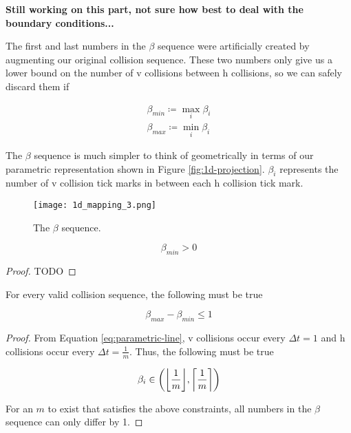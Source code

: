 \textbf{Still working on this part, not sure how best to deal with the boundary conditions...}

The first and last numbers in the $\beta$ sequence were artificially created by augmenting our original collision sequence. These two numbers only give us a lower bound on the number of v collisions between h collisions, so we can safely discard them if 

\begin{definition}
	\begin{align*}
		\beta_{min} \coloneqq \max_i \beta_i\\
		\beta_{max} \coloneqq \min_i \beta_i
	\end{align*}
\end{definition}

The $\beta$ sequence is much simpler to think of geometrically in terms of our parametric representation shown in Figure \ref{fig:1d-projection}. $\beta_i$ represents the number of v collision tick marks in between each h collision tick mark.

\begin{figure}[H]
  \begin{center}
    \texttt{[image: 1d\_mapping\_3.png]}
  \end{center}
  \vspace{-.2in} %
  \caption{\label{fig:beta-sequence} The $\beta$ sequence.}
\end{figure}

\begin{lemma}
	\[
		\beta_{min} > 0
	\]
\end{lemma}

\begin{proof}
	TODO
\end{proof}

\begin{theorem}
	For every valid collision sequence, the following must be true
	
	\[
		\beta_{max} - \beta_{min} \le 1
	\]
\end{theorem}

\begin{proof}

From Equation \ref{eq:parametric-line}, v collisions occur every $\Delta t = 1$ and h collisions occur every $\Delta t = \frac{1}{m}$. Thus, the following must be true

\[
	\beta_i \in \paren{\floor{\frac{1}{m}}, \ceil{\frac{1}{m}}}
\]

For an $m$ to exist that satisfies the above constraints, all numbers in the $\beta$ sequence can only differ by 1.

\end{proof}


